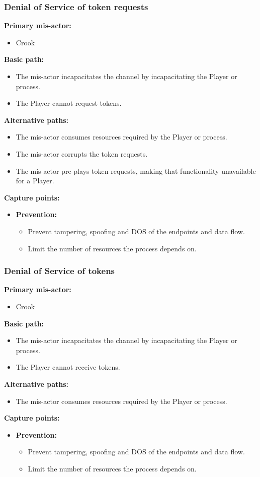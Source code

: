 \documentclass[a4paper,11pt]{report}
\begin{document}
\subsubsection{Denial of Service of token requests}
\label{PlayerFlowCasesD1}
\textbf{Primary mis-actor:}
\begin{itemize}
\item Crook
\end{itemize}
\textbf{Basic path:}
\begin{itemize}
\item The mis-actor incapacitates the channel by incapacitating the Player or process.
\item The Player cannot request tokens.
\end{itemize}
\textbf{Alternative paths:}
\begin{itemize}
\item The mis-actor consumes resources required by the Player or process.
\item The mis-actor corrupts the token requests.
\item The mis-actor pre-plays token requests, making that functionality unavailable for a Player.
\end{itemize}
\textbf{Capture points:}
\begin{itemize}
\item \textbf{Prevention:}
\begin{itemize}
\item Prevent tampering, spoofing and DOS of the endpoints and data flow.
\item Limit the number of resources the process depends on.
\end{itemize}
\end{itemize}

\subsubsection{Denial of Service of tokens}
\label{PlayerFlowCasesD2}
\textbf{Primary mis-actor:}
\begin{itemize}
\item Crook
\end{itemize}
\textbf{Basic path:}
\begin{itemize}
\item The mis-actor incapacitates the channel by incapacitating the Player or process.
\item The Player cannot receive tokens.
\end{itemize}
\textbf{Alternative paths:}
\begin{itemize}
\item The mis-actor consumes resources required by the Player or process.
\end{itemize}
\textbf{Capture points:}
\begin{itemize}
\item \textbf{Prevention:}
\begin{itemize}
\item Prevent tampering, spoofing and DOS of the endpoints and data flow.
\item Limit the number of resources the process depends on.
\end{itemize}
\end{itemize}
\end{document}
